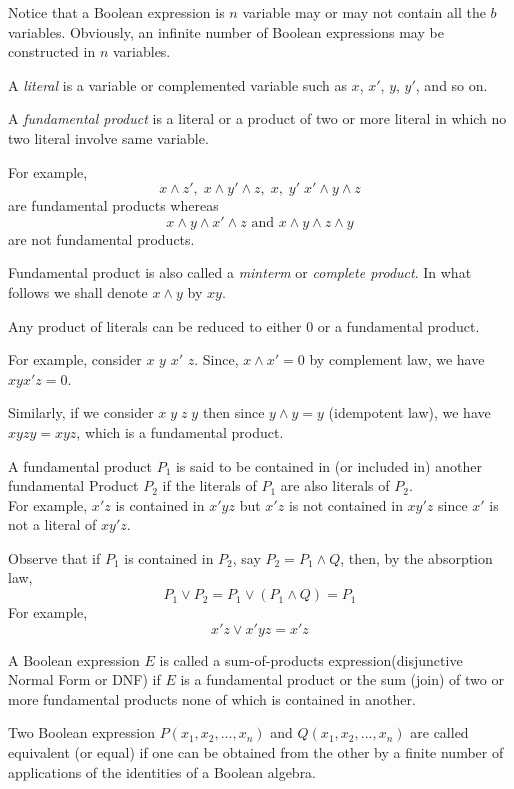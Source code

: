 \documentclass[../main-sheet.tex]{subfiles}
\begin{document}
Notice that a Boolean expression is $ n $ variable may or may not contain all the $ b $ variables. Obviously, an infinite number of Boolean expressions may be constructed in $ n $ variables.
\begin{defn}[Literal]
    A \emph{literal} is a variable or complemented variable such as $ x $, $ x' $, $ y $, $ y' $, and so on.
\end{defn}
\begin{defn}
    A \emph{fundamental product} is a literal or a product of two or more literal in which no two literal involve same variable.
\end{defn}
For example, 
\[
    x\land z',\;x\land y'\land z,\;x,\;y'\;x'\land y\land z
\]
are fundamental products whereas
\[
    x\land y\land x'\land z \text{ and } x\land y\land z\land y
\]
are not fundamental products.
\begin{rem}
    Fundamental product is also called a \emph{minterm} or \emph{complete product}. In what follows we shall denote $ x\land y $ by $ xy $.
\end{rem}
Any product of literals can be reduced to either 0 or a fundamental product.

For example, consider $ x $ $ y $ $ x' $ $ z $. Since, $ x\land x'=0 $ by complement law, we have $ xyx'z=0 $.

Similarly, if we consider $ x\;y\;z\;y $ then since $ y\land y=y $ (idempotent law), we have $ xyzy=xyz $, which is a fundamental product.
\begin{defn}
    A fundamental product $ P_1 $ is said to be contained in (or included in) another fundamental Product $ P_2 $ if the literals of $ P_1 $ are also literals of $ P_2 $.\\
    For example, $ x'z $ is contained in $ x'yz $ but $ x'z $ is not contained in $ xy'z $ since $ x' $ is not a literal of $ xy'z $.
\end{defn}
Observe that if $ P_1 $ is contained in $ P_2 $, say $ P_2=P_1\land Q $, then, by the absorption law,
\[
    P_1\lor P_2=P_1\lor (P_1\land Q)=P_1
\]
For example,
\[
    x'z\lor x'yz=x'z
\]
\begin{defn}
    A Boolean expression $ E $ is called a sum-of-products expression(disjunctive Normal Form or DNF) if $ E $ is a fundamental product or the sum (join) of two or more fundamental products none of which is contained in another.
\end{defn}
\begin{defn}
    Two Boolean expression $ P(x_1,x_2,\dots,x_n)$ and $ Q(x_1,x_2,\dots,x_n)$ are called equivalent (or equal) if one can be obtained from the other by a finite number of applications of the identities of a Boolean algebra.
\end{defn}
\end{document}
